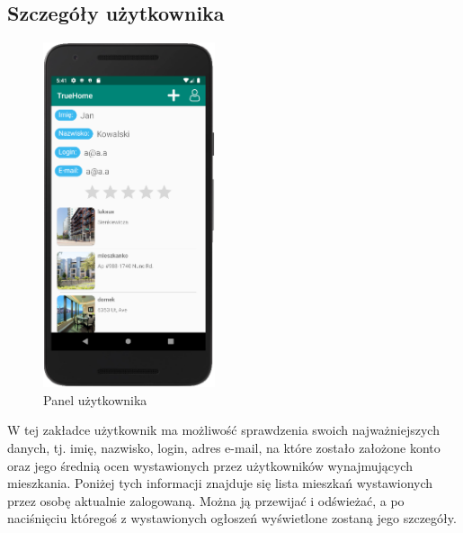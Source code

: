 \documentclass[polish, 11pt]{article}
\begin{document}
      \subsection{Szczegóły użytkownika}
        \begin{figure}[H]
                    \centering
                    \includegraphics[width=0.45\textwidth]{aplikacja/user_panel.png}
                    \caption{Panel użytkownika}
        \end{figure}
        
        W tej zakładce użytkownik ma możliwość sprawdzenia swoich najważniejszych danych, tj. imię, nazwisko, login, adres e-mail, na które zostało założone konto oraz jego średnią ocen wystawionych przez użytkowników wynajmujących mieszkania. Poniżej tych informacji znajduje się lista mieszkań wystawionych przez osobę aktualnie zalogowaną. Można ją przewijać i odświeżać, a po naciśnięciu któregoś z wystawionych ogłoszeń wyświetlone zostaną jego szczegóły.
        
\end{document}
